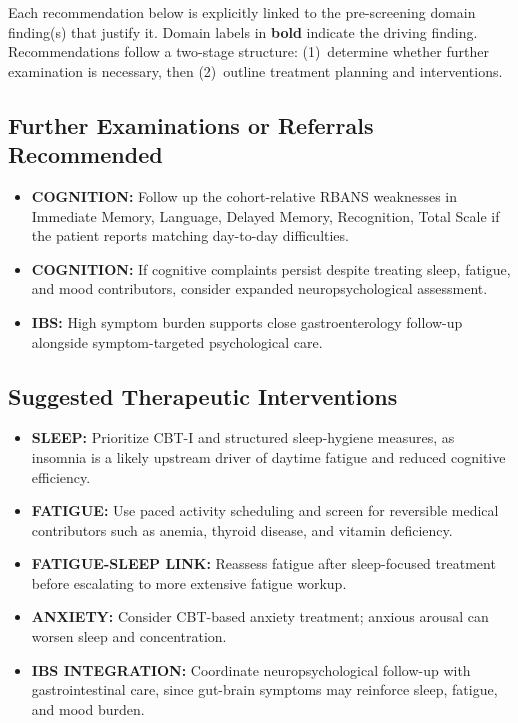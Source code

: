 \documentclass[11pt,a4paper]{article}
\begin{document}
Each recommendation below is explicitly linked to the pre-screening domain finding(s) that justify it. Domain labels in \textbf{bold} indicate the driving finding. Recommendations follow a two-stage structure: (1)~determine whether further examination is necessary, then (2)~outline treatment planning and interventions.

\subsection{Further Examinations or Referrals Recommended}
\begin{itemize}[leftmargin=*]
  \item \textbf{COGNITION:} Follow up the cohort-relative RBANS weaknesses in Immediate Memory, Language, Delayed Memory, Recognition, Total Scale if the patient reports matching day-to-day difficulties.
  \item \textbf{COGNITION:} If cognitive complaints persist despite treating sleep, fatigue, and mood contributors, consider expanded neuropsychological assessment.
  \item \textbf{IBS:} High symptom burden supports close gastroenterology follow-up alongside symptom-targeted psychological care.
\end{itemize}

\subsection{Suggested Therapeutic Interventions}
\begin{itemize}[leftmargin=*]
  \item \textbf{SLEEP:} Prioritize CBT-I and structured sleep-hygiene measures, as insomnia is a likely upstream driver of daytime fatigue and reduced cognitive efficiency.
  \item \textbf{FATIGUE:} Use paced activity scheduling and screen for reversible medical contributors such as anemia, thyroid disease, and vitamin deficiency.
  \item \textbf{FATIGUE-SLEEP LINK:} Reassess fatigue after sleep-focused treatment before escalating to more extensive fatigue workup.
  \item \textbf{ANXIETY:} Consider CBT-based anxiety treatment; anxious arousal can worsen sleep and concentration.
  \item \textbf{IBS INTEGRATION:} Coordinate neuropsychological follow-up with gastrointestinal care, since gut-brain symptoms may reinforce sleep, fatigue, and mood burden.
\end{itemize}
\end{document}
